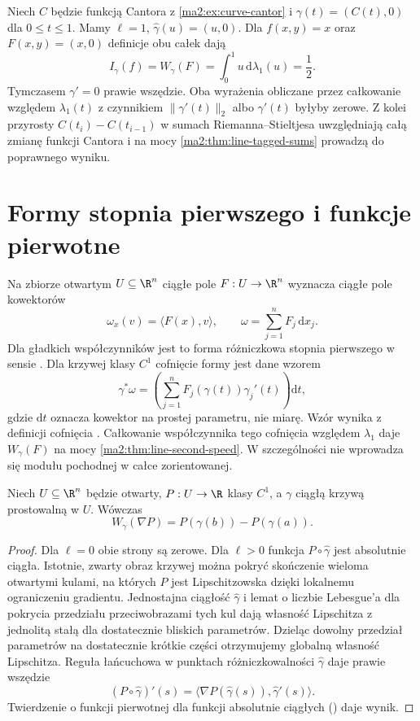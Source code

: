 \begin{przyklad}
\label{ma2:ex:line-cantor}
Niech $C$ będzie funkcją Cantora z
\ref{ma2:ex:curve-cantor} i
$\gamma(t)=(C(t),0)$ dla $0\le t\le1$.
Mamy $\ell=1$, $\widehat\gamma(u)=(u,0)$.
Dla $f(x,y)=x$ oraz $F(x,y)=(x,0)$
definicje obu całek dają
\[
 I_\gamma(f)=W_\gamma(F)
 =\int_0^1 u\,\mathrm d\lambda_1(u)=\frac12.
\]
Tymczasem $\gamma'=0$ prawie wszędzie.
Oba wyrażenia obliczane przez całkowanie
względem $\lambda_1(t)$ z czynnikiem
$\|\gamma'(t)\|_2$ albo $\gamma'(t)$
byłyby zerowe. Z kolei przyrosty $C(t_i)-C(t_{i-1})$
w sumach Riemanna--Stieltjesa uwzględniają
całą zmianę funkcji Cantora i na mocy
\ref{ma2:thm:line-tagged-sums} prowadzą
do poprawnego wyniku.
\end{przyklad}

\section{Formy stopnia pierwszego i funkcje pierwotne}

Na zbiorze otwartym $U\subseteq\R^n$
ciągłe pole $F:U\to\R^n$ wyznacza ciągłe
pole kowektorów
\[
 \omega_x(v)=\langle F(x),v\rangle,\qquad
 \omega=\sum_{j=1}^nF_j\,\mathrm dx_j .
\]
Dla gładkich współczynników jest to forma
różniczkowa stopnia pierwszego w sensie
.
Dla krzywej klasy $C^1$ cofnięcie formy
jest dane wzorem
\[
 \gamma^*\omega=
 \left(\sum_{j=1}^n F_j(\gamma(t))\gamma_j'(t)\right)
 \mathrm dt,
\]
gdzie $\mathrm dt$ oznacza kowektor na
prostej parametru, nie miarę.
Wzór wynika z definicji cofnięcia
.
Całkowanie współczynnika tego cofnięcia
względem $\lambda_1$ daje
$W_\gamma(F)$ na mocy
\ref{ma2:thm:line-second-speed}.
W szczególności nie wprowadza się modułu
pochodnej w całce zorientowanej.

\begin{twierdzenie}
\label{ma2:thm:line-fundamental}
Niech $U\subseteq\R^n$ będzie otwarty,
$P:U\to\R$ klasy $C^1$, a $\gamma$
ciągłą krzywą prostowalną w $U$.
Wówczas
\[
 W_\gamma(\nabla P)=P(\gamma(b))-P(\gamma(a)).
\]
\end{twierdzenie}
\begin{proof}
Dla $\ell=0$ obie strony są zerowe.
Dla $\ell>0$ funkcja $P\circ\widehat\gamma$
jest absolutnie ciągła. Istotnie, zwarty
obraz krzywej można pokryć skończenie wieloma
otwartymi kulami, na których $P$ jest
Lipschitzowska dzięki lokalnemu ograniczeniu
gradientu. Jednostajna ciągłość
$\widehat\gamma$ i lemat o liczbie Lebesgue'a
dla pokrycia przedziału przeciwobrazami tych kul
dają własność Lipschitza z jednolitą stałą
dla dostatecznie bliskich parametrów.
Dzieląc dowolny przedział parametrów na
dostatecznie krótkie części otrzymujemy
globalną własność Lipschitza.
Reguła łańcuchowa w punktach
różniczkowalności $\widehat\gamma$
daje prawie wszędzie
\[
 (P\circ\widehat\gamma)'(s)=
 \langle\nabla P(\widehat\gamma(s)),
 \widehat\gamma'(s)\rangle .
\]
Twierdzenie o funkcji pierwotnej dla
funkcji absolutnie ciągłych
()
daje wynik.
\end{proof}

